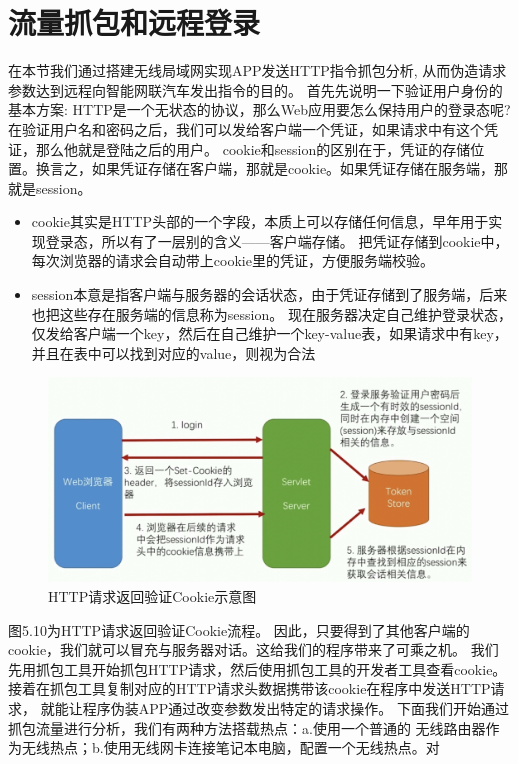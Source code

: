 \section{流量抓包和远程登录}
在本节我们通过搭建无线局域网实现APP发送HTTP指令抓包分析, 从而伪造请求参数达到远程向智能网联汽车发出指令的目的。
首先先说明一下验证用户身份的基本方案: HTTP是一个无状态的协议，那么Web应用要怎么保持用户的登录态呢?
在验证用户名和密码之后，我们可以发给客户端一个凭证，如果请求中有这个凭证，那么他就是登陆之后的用户。
cookie和session的区别在于，凭证的存储位置。换言之，如果凭证存储在客户端，那就是cookie。如果凭证存储在服务端，那就是session。
\begin{itemize}
  \item cookie其实是HTTP头部的一个字段，本质上可以存储任何信息，早年用于实现登录态，所以有了一层别的含义——客户端存储。
  把凭证存储到cookie中，每次浏览器的请求会自动带上cookie里的凭证，方便服务端校验。
  \item session本意是指客户端与服务器的会话状态，由于凭证存储到了服务端，后来也把这些存在服务端的信息称为session。
  现在服务器决定自己维护登录状态，仅发给客户端一个key，然后在自己维护一个key-value表，如果请求中有key，并且在表中可以找到对应的value，则视为合法
\end{itemize}
\begin{figure}
  \centering
  \includegraphics[scale=0.5]{resources/img/i25.png}
  \caption{HTTP请求返回验证Cookie示意图}
\end{figure} 
图5.10为HTTP请求返回验证Cookie流程。
因此，只要得到了其他客户端的cookie，我们就可以冒充与服务器对话。这给我们的程序带来了可乘之机。
我们先用抓包工具开始抓包HTTP请求，然后使用抓包工具的开发者工具查看cookie。
接着在抓包工具复制对应的HTTP请求头数据携带该cookie在程序中发送HTTP请求，
就能让程序伪装APP通过改变参数发出特定的请求操作。
\newline
下面我们开始通过抓包流量进行分析，我们有两种方法搭载热点：a.使用一个普通的
无线路由器作为无线热点；b.使用无线网卡连接笔记本电脑，配置一个无线热点。对
